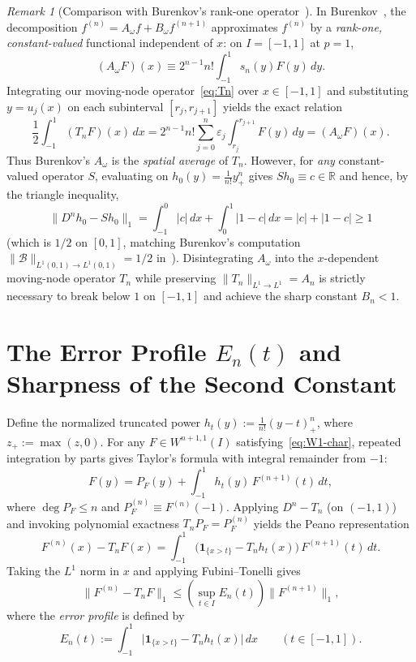 \documentclass[11pt,a4paper]{article}
\newcommand{\R}{\mathbb{R}}
\newcommand{\Lone}[1]{\lVert #1\rVert_1}
\theoremstyle{remark}
\newtheorem{remark}[proposition]{Remark}
\numberwithin{equation}{section}
\begin{document}
\begin{remark}[Comparison with Burenkov's rank-one operator~\cite{Burenkov1986}]
    \label{rem:burenkov-op}
    In Burenkov~\cite[Theorem~2(1), p.~41; eqs.~(24)--(26), p.~42]{Burenkov1986}, the decomposition $f^{(n)} = A_\omega f + B_\omega f^{(n+1)}$ approximates $f^{(n)}$ by a \emph{rank-one, constant-valued} functional independent of $x$: on $I = [-1,1]$ at $p = 1$,
    \[
        (A_\omega F)(x) \equiv 2^{n-1} n! \int_{-1}^{1} s_n(y) F(y)\,dy.
    \]
    Integrating our moving-node operator~\eqref{eq:Tn} over $x \in [-1,1]$ and substituting $y = u_j(x)$ on each subinterval $[r_j, r_{j+1}]$ yields the exact relation
    \[
        \frac12 \int_{-1}^{1} (T_n F)(x)\,dx
        = 2^{n-1} n! \sum_{j=0}^{n} \varepsilon_j \int_{r_j}^{r_{j+1}} F(y)\,dy
        = (A_\omega F)(x).
    \]
    Thus Burenkov's $A_\omega$ is the \emph{spatial average} of $T_n$. However, for \emph{any} constant-valued operator $S$, evaluating on $h_0(y) = \frac{1}{n!}y_+^n$ gives $S h_0 \equiv c \in \R$ and hence, by the triangle inequality,
    \[
        \Lone{D^n h_0 - S h_0}
        = \int_{-1}^{0} |c|\,dx + \int_0^1 |1 - c|\,dx
        = |c| + |1 - c| \ge 1
    \]
    (which is $1/2$ on $[0,1]$, matching Burenkov's computation $\lVert \mathcal{B}\rVert_{L^1(0,1)\to L^1(0,1)} = 1/2$ in~\cite[p.~43]{Burenkov1986}). Disintegrating $A_\omega$ into the $x$-dependent moving-node operator $T_n$ while preserving $\lVert T_n\rVert_{L^1 \to L^1} = A_n$ is strictly necessary to break below $1$ on $[-1,1]$ and achieve the sharp constant $B_n < 1$.
\end{remark}

\section{The Error Profile \texorpdfstring{$E_n(t)$}{E\_n(t)} and Sharpness of the Second Constant}
\label{sec:sharp}

Define the normalized truncated power $h_t(y) := \frac{1}{n!}(y - t)_+^n$, where $z_+ := \max(z, 0)$. For any $F \in W^{n+1,1}(I)$ satisfying~\eqref{eq:W1-char}, repeated integration by parts gives Taylor's formula with integral remainder from $-1$:
\[
    F(y) = P_F(y) + \int_{-1}^{1} h_t(y)\, F^{(n+1)}(t)\,dt,
\]
where $\deg P_F \le n$ and $P_F^{(n)} \equiv F^{(n)}(-1)$. Applying $D^n - T_n$ (on $(-1,1)$) and invoking polynomial exactness $T_n P_F = P_F^{(n)}$ yields the Peano representation
\begin{equation}
    F^{(n)}(x) - T_n F(x)
    = \int_{-1}^{1} \bigl(\mathbf{1}_{\{x > t\}} - T_n h_t(x)\bigr)\, F^{(n+1)}(t)\,dt.
    \label{eq:peano}
\end{equation}
Taking the $L^1$ norm in $x$ and applying Fubini--Tonelli gives
\[
    \Lone{F^{(n)} - T_n F} \le \left(\sup_{t \in I} E_n(t)\right)\Lone{F^{(n+1)}},
\]
where the \emph{error profile} is defined by
\begin{equation}
    E_n(t) := \int_{-1}^{1} \bigl|\mathbf{1}_{\{x > t\}} - T_n h_t(x)\bigr|\,dx
    \qquad (t \in [-1,1]).
    \label{eq:En-def}
\end{equation}
\end{document}
